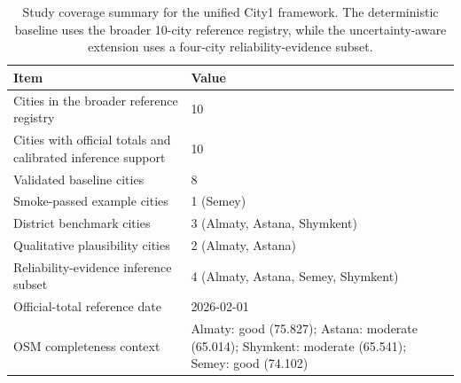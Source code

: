 \begin{table}[H]
\centering
\caption{Study coverage summary for the unified City1 framework. The deterministic baseline uses the broader 10-city reference registry, while the uncertainty-aware extension uses a four-city reliability-evidence subset.}
\label{tab:study-coverage-unified}
\begin{tabular}{p{}p{}}
\toprule
Item & Value \\
\midrule
Cities in the broader reference registry & 10 \\
Cities with official totals and calibrated inference support & 10 \\
Validated baseline cities & 8 \\
Smoke-passed example cities & 1 (Semey) \\
District benchmark cities & 3 (Almaty, Astana, Shymkent) \\
Qualitative plausibility cities & 2 (Almaty, Astana) \\
Reliability-evidence inference subset & 4 (Almaty, Astana, Semey, Shymkent) \\
Official-total reference date & 2026-02-01 \\
OSM completeness context & Almaty: good (75.827); Astana: moderate (65.014); Shymkent: moderate (65.541); Semey: good (74.102) \\
\bottomrule
\end{tabular}
\end{table}

